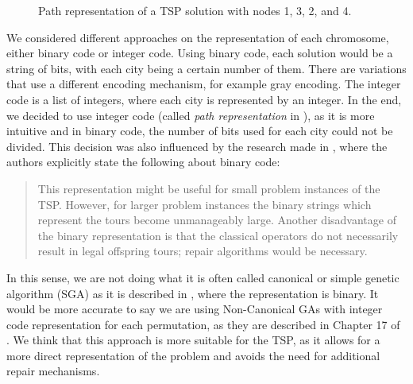 \documentclass[11pt]{article}
\begin{document}
\begin{figure}[h]
    \centering
    \caption{Path representation of a TSP solution with nodes 1, 3, 2, and 4.}
    \label{fig:tsp_example}
\end{figure}


We considered different approaches on the representation of each chromosome, either binary code or integer code. Using binary code, each solution would be a string of bits, with each city being a certain number of them. There are variations that use a different encoding mechanism, for example gray encoding. The integer code is a list of integers, where each city is represented by an integer. In the end, we decided to use integer code (called \textit{path representation} in \cite{Larranaga1999}), as it is more intuitive and in binary code, the number of bits used for each city could not be divided. This decision was also influenced by the research made in \cite{Larranaga1999}, where the authors explicitly state the following about binary code:
\begin{quote}
This representation might be useful for small problem instances of the TSP.
However, for larger problem instances the binary strings which represent
the tours become unmanageably large. Another disadvantage of the binary
representation is that the classical operators do not necessarily result in legal
offspring tours; repair algorithms would be necessary.
\end{quote}

In this sense, we are not doing what it is often called canonical or simple genetic algorithm (SGA) as it is described in \cite{Eiben2003}, where the representation is binary. It would be more accurate to say we are using Non-Canonical GAs with integer code representation for each permutation, as they are described in Chapter 17 of \cite{Back2000}. We think that this approach is more suitable for the TSP, as it allows for a more direct representation of the problem and avoids the need for additional repair mechanisms.
\end{document}
